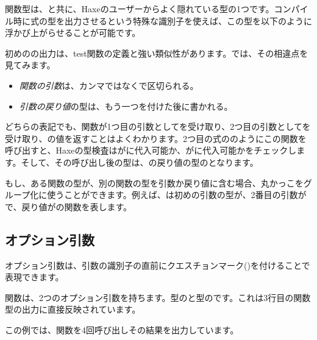 
関数型は、と共に、Haxeのユーザーからよく隠れている型の1つです。コンパイル時に式の型を出力させるという特殊な識別子を使えば、この型を以下のように浮かび上がらせることが可能です。


初めのの出力は、test関数の定義と強い類似性があります。では、その相違点を見てみます。

\begin{itemize}
	\item \emph{関数の引数}は、カンマではなく\expr{->}で区切られる。
	\item \emph{引数の戻り値}の型は、もう一つ\expr{->}を付けた後に書かれる。
\end{itemize}

どちらの表記でも、関数が1つ目の引数としてを受け取り、2つ目の引数としてを受け取り、の値を返すことはよくわかります。2つ目の式ののようにこの関数を呼び出すと、Haxeの型検査はがに代入可能か、がに代入可能かをチェックします。そして、その呼び出し後の型は、の戻り値の型のとなります。

もし、ある関数の型が、別の関数の型を引数か戻り値に含む場合、丸かっこをグループ化に使うことができます。例えば、は初めの引数の型が、2番目の引数がで、戻り値がの関数を表します。

\subsection{オプション引数}
\label{types-function-optional-arguments}

オプション引数は、引数の識別子の直前にクエスチョンマーク()を付けることで表現できます。


関数は、2つのオプション引数を持ちます。型のと型のです。これは3行目の関数型の出力に直接反映されています。

この例では、関数を4回呼び出しその結果を出力しています。

